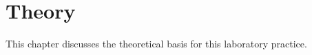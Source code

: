 
\chapter{Theory}
\label{cha:theory}

This chapter discusses the theoretical basis for this laboratory practice.



